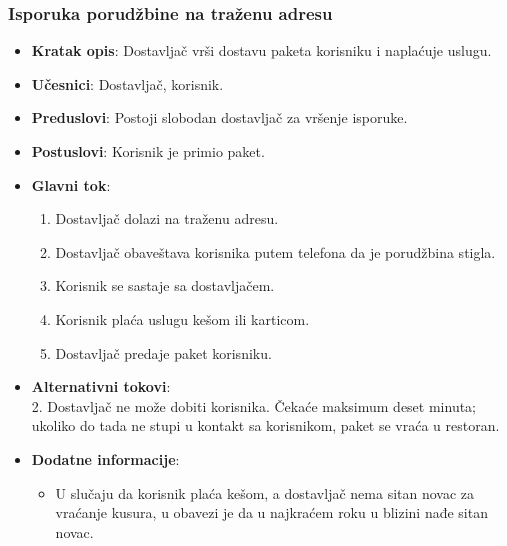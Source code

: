  \subsubsection{Isporuka porudžbine na traženu adresu}
 \begin{itemize}
    \item \textbf{Kratak opis}: Dostavljač vrši dostavu paketa korisniku i naplaćuje uslugu.
    \item \textbf{Učesnici}:
    Dostavljač, korisnik.
    \item \textbf{Preduslovi}:
    Postoji slobodan dostavljač za vršenje isporuke.
    \item \textbf{Postuslovi}:
    Korisnik je primio paket.
    \item \textbf{Glavni tok}:
    \begin{enumerate}
        \item Dostavljač dolazi na traženu adresu.
        \item Dostavljač obaveštava korisnika putem telefona da je porudžbina stigla.
        \item Korisnik se sastaje sa dostavljačem.
        \item Korisnik plaća uslugu kešom ili karticom.
        \item Dostavljač predaje paket korisniku.
 \end{enumerate}
    \item \textbf{Alternativni tokovi}:\\
        2. Dostavljač ne može dobiti korisnika. Čekaće maksimum deset minuta; ukoliko do tada ne stupi u kontakt sa korisnikom, paket se vraća u restoran.
    \item \textbf{Dodatne informacije}:
     \begin{itemize}
     \item U slučaju da korisnik plaća kešom, a dostavljač nema sitan novac za vraćanje kusura, u obavezi je da u najkraćem roku u blizini nađe sitan novac.
 \end{itemize}
 
 \end{itemize}